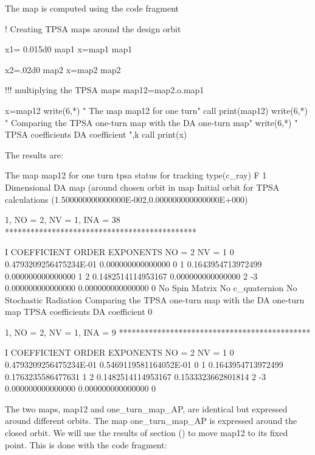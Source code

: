 \documentclass{hitec}     %
\begin{document}
{{{{{{ The map is computed using the code fragment
 
 \renewcommand{\codefont}{\footnotesize}
\begin{code}
!  Creating TPSA maps around the design orbit 

x1= 0.015d0
map1%
x=map1%
map1%

x2=.02d0
map2%
x=map2%
map2%

!!! multiplying the TPSA maps
 map12=map2.o.map1
  
 
x=map12%
 write(6,*)  "    The map map12 for one turn"
 call print(map12)
 write(6,*)  "    Comparing the TPSA one-turn map with the DA one-turn map"
 write(6,*)  "    TPSA coefficients      DA coefficient ",k
 call print(x)
\end{code}
 \renewcommand{\codefont}{\small}

The results are: 

\begin{code}
     The map map12 for one turn
  tpsa status for tracking type(c_ray)  F
           1  Dimensional DA map (around chosen orbit in map%
 Initial orbit for TPSA calculations
 (1.500000000000000E-002,0.000000000000000E+000)

          1, NO =    2, NV =    1, INA =   38
 *********************************************

    I  COEFFICIENT          ORDER   EXPONENTS
      NO =     2      NV =     1
   0  0.4793209256475234E-01   0.000000000000000       0
   1  0.1643954713972499       0.000000000000000       1
   2  0.1482514114953167       0.000000000000000       2
    -3   0.000000000000000       0.000000000000000       0
  No Spin Matrix
  No c_quaternion
 No Stochastic Radiation
     Comparing the TPSA one-turn map with the DA one-turn map
     TPSA coefficients      DA coefficient            0

          1, NO =    2, NV =    1, INA =    9
 *********************************************

    I  COEFFICIENT          ORDER   EXPONENTS
      NO =     2      NV =     1
   0  0.4793209256475234E-01  0.5469119581164052E-01   0
   1  0.1643954713972499      0.1763235586477631       1
   2  0.1482514114953167      0.1533323662801814       2
    -3   0.000000000000000       0.000000000000000       0
 \end{code}

The two maps, map12 and one_turn_map_AP, are identical but expressed around different orbits.  The map one_turn_map_AP is expressed around the closed orbit. We will use the results of section () to move map12 to its fixed point. This is done with the code fragment:


}}}}}}
\end{document}
